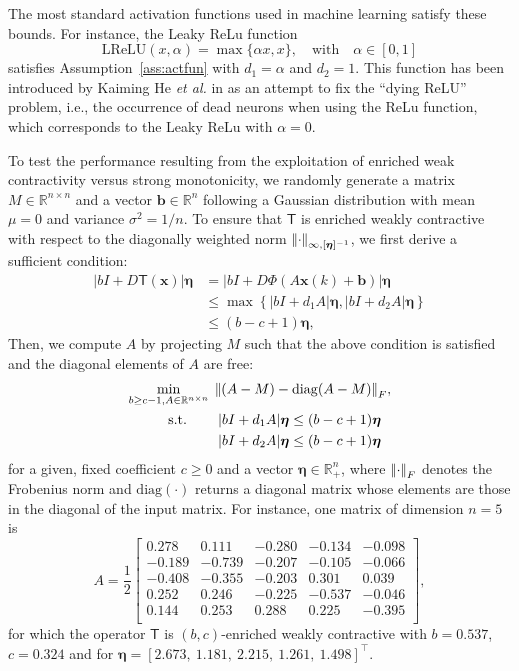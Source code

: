 \documentclass[journal,twoside,web]{ieeecolor}
\newcommand{\virg}[1]{``#1''}
\newcommand{\abs}[1]{{\left\vert #1 \right\vert}}
\newcommand{\norm}[1]{{\left\vert\kern-0.25ex\left\vert #1\right\vert\kern-0.25ex\right\vert}}
\newcommand{\rea }{\mathbb{R}}
\newcommand{\xb}{\boldsymbol{x}}
\newcommand{\bb}{\boldsymbol{b}}
\newcommand{\etab}{\boldsymbol{\eta}}
\newcommand{\Ts}{\mathsf{T}}
\newcommand{\LReLU}{\mathrm{LReLU}}
\newcommand{\diag}{\mathrm{diag}}
\begin{document}
The most standard activation functions used in machine learning satisfy these bounds. For instance, the Leaky ReLu function
%
$$
\LReLU(x,\alpha) = \max\{\alpha x, x\},\quad \text{with}
\quad \alpha\in[0,1]
$$
satisfies Assumption~\ref{ass:actfun} with $d_1 = \alpha$ and $d_2=1$. This function has been introduced by Kaiming He \textit{et al.} in \cite{he2015delving} as an attempt to fix the \virg{dying ReLU} problem, i.e., the occurrence of dead neurons when using the ReLu function, which corresponds to the Leaky ReLu with $\alpha=0$. 

To test the performance resulting from the exploitation of enriched weak contractivity versus strong monotonicity, we randomly generate a matrix $M\in\rea^{n\times n}$ and a vector ${\bb\in\rea^n}$ following a Gaussian distribution with mean $\mu=0$ and variance $\sigma^2=1/n$. 
%
To ensure that $\Ts$ is enriched weakly contractive with respect to the diagonally weighted norm $\norm{\cdot}_{\infty,[\etab]^{-1}}$, we first derive a sufficient condition:
%
$$
\begin{aligned}
    \abs{b I + D\Ts(\xb)}\etab & = \abs{b I + D \Phi(A\xb(k) + \bb)}\etab \\
    & \leq \max\left\{\abs{b I + d_1A}\etab,\abs{b I + d_2A}\etab\right\} \\
    & \leq (b-c+1)\etab,
\end{aligned}
$$
%
Then, we compute $A$ by projecting $M$ such that the above condition is satisfied and the diagonal elements of $A$ are free:
%
$$
\begin{aligned}
\min_{b\geq c-1,A\in\rea^{n\times n}} \:\: & 
\norm{(A-M) - \diag(A-M)}_{F},\\
\text{s.t.} \qquad &\: \abs{b I + d_1A}\etab  \leq (b-c+1)\etab\\
& \: \abs{b I + d_2A}\etab  \leq (b-c+1)\etab
\end{aligned}
$$
%
for a given, fixed coefficient $c\geq 0$ and a vector $\etab\in\rea^{n}_{+}$, where $\norm{\cdot}_{F}$ denotes the Frobenius norm and $\diag(\cdot)$ returns a diagonal matrix whose elements are those in the diagonal of the input matrix.
%
%
For instance, one matrix of dimension $n=5$ is
%
$$
A = \frac{1}{2}\begin{bmatrix}
    0.278&     0.111&    -0.280&     -0.134 & -0.098\\
    -0.189&    -0.739&    -0.207&     -0.105 & -0.066\\
    -0.408 & -0.355 & -0.203 & 0.301 & 0.039\\
    0.252 & 0.246 & -0.225 & -0.537 & -0.046\\
    0.144 & 0.253 & 0.288 & 0.225 & -0.395\\
\end{bmatrix},
$$
%
for which the operator $\Ts$ is $(b,c)$-enriched weakly contractive with $b=0.537$, $c=0.324$ and for ${\etab = [2.673, \: 1.181, \: 2.215, \: 1.261, \: 1.498]^\top}$.
\end{document}
